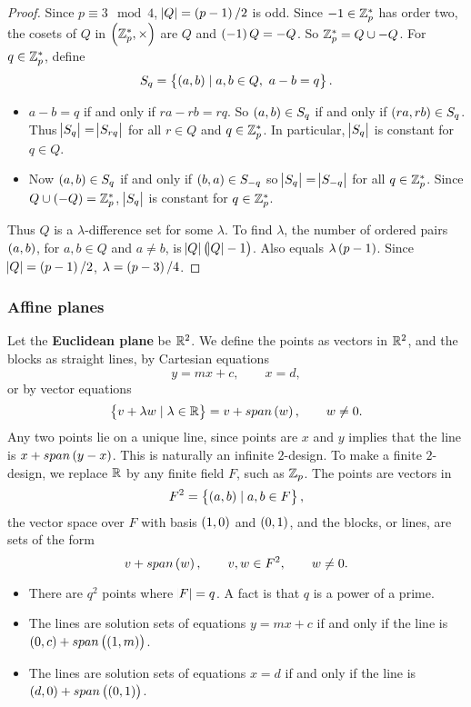 \begin{proof}
Since $ p \equiv 3 \mod 4 $, $ \abs{Q} = \br{p - 1} / 2 $ is odd. Since $ -1 \in \mathbb{Z}_p^* $ has order two, the cosets of $ Q $ in $ \br{\Z_p^*, \times} $ are $ Q $ and $ \br{-1}Q = -Q $. So $ \mathbb{Z}_p^* = Q \cup -Q $. For $ q \in \mathbb{Z}_p^* $, define
$$ S_q = \cbr{\br{a, b} \mid a, b \in Q, \ a - b = q}. $$
\begin{itemize}
\item $ a - b = q $ if and only if $ ra - rb = rq $. So $ \br{a, b} \in S_q $ if and only if $ \br{ra, rb} \in S_q $. Thus $ \abs{S_q} = \abs{S_{rq}} $ for all $ r \in Q $ and $ q \in \mathbb{Z}_p^* $. In particular, $ \abs{S_q} $ is constant for $ q \in Q $.
\item Now $ \br{a, b} \in S_q $ if and only if $ \br{b, a} \in S_{-q} $ so $ \abs{S_q} = \abs{S_{-q}} $ for all $ q \in \mathbb{Z}_p^* $. Since $ Q \cup \br{-Q} = \Z_p^* $, $ \abs{S_q} $ is constant for $ q \in \mathbb{Z}_p^* $.
\end{itemize}
Thus $ Q $ is a $ \lambda $-difference set for some $ \lambda $. To find $ \lambda $, the number of ordered pairs $ \br{a, b} $, for $ a, b \in Q $ and $ a \ne b $, is $ \abs{Q}\br{\abs{Q} - 1} $. Also equals $ \lambda\br{p - 1} $. Since $ \abs{Q} = \br{p - 1} / 2 $, $ \lambda = \br{p - 3} / 4 $.
\end{proof}

\subsubsection{Affine planes}

Let the \textbf{Euclidean plane} be $ \mathbb{R}^2 $. We define the points as vectors in $ \mathbb{R}^2 $, and the blocks as straight lines, by Cartesian equations
$$ y = mx + c, \qquad x = d, $$
or by vector equations
$$ \cbr{v + \lambda w \mid \lambda \in \R} = v + span\br{w}, \qquad w \ne 0. $$
Any two points lie on a unique line, since points are $ x $ and $ y $ implies that the line is $ x + span\br{y - x} $. This is naturally an infinite $ 2 $-design. To make a finite $ 2 $-design, we replace $ \mathbb{R} $ by any finite field $ F $, such as $ \mathbb{Z}_p $. The points are vectors in
$$ F^2 = \cbr{\br{a, b} \mid a, b \in F}, $$
the vector space over $ F $ with basis $ \br{1, 0} $ and $ \br{0, 1} $, and the blocks, or lines, are sets of the form
$$ v + span\br{w}, \qquad v, w \in F^2, \qquad w \ne 0. $$

\begin{note*}
\hfill
\begin{itemize}
\item There are $ q^2 $ points where $ \abs{F} = q $. A fact is that $ q $ is a power of a prime.
\item The lines are solution sets of equations $ y = mx + c $ if and only if the line is $ \br{0, c} + span\br{\br{1, m}} $.
\item The lines are solution sets of equations $ x = d $ if and only if the line is $ \br{d, 0} + span\br{\br{0, 1}} $.
\end{itemize}
\end{note*}


